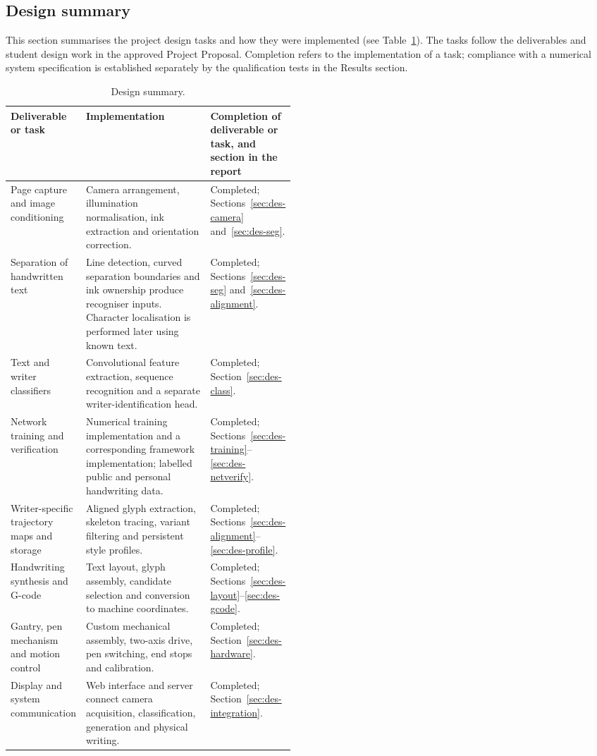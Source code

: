 \subsection{Design summary}
\label{sec:des-summary}
This section summarises the project design tasks and how they were implemented (see Table~\ref{tab:des-summary}). The tasks follow the deliverables and student design work in the approved Project Proposal. Completion refers to the implementation of a task; compliance with a numerical system specification is established separately by the qualification tests in the Results section.

\begin{table}[!htbp]
\centering\small
\begin{tabularx}{\linewidth}{|>{\raggedright\arraybackslash}p{0.24\linewidth}|>{\raggedright\arraybackslash}X|>{\raggedright\arraybackslash}p{0.23\linewidth}|}
\hline
\textbf{Deliverable or task}&\textbf{Implementation}&\textbf{Completion of deliverable or task, and section in the report}\\\hline
Page capture and image conditioning&Camera arrangement, illumination normalisation, ink extraction and orientation correction.&Completed; Sections~\ref{sec:des-camera} and~\ref{sec:des-seg}.\\\hline
Separation of handwritten text&Line detection, curved separation boundaries and ink ownership produce recogniser inputs. Character localisation is performed later using known text.&Completed; Sections~\ref{sec:des-seg} and~\ref{sec:des-alignment}.\\\hline
Text and writer classifiers&Convolutional feature extraction, sequence recognition and a separate writer-identification head.&Completed; Section~\ref{sec:des-class}.\\\hline
Network training and verification&Numerical training implementation and a corresponding framework implementation; labelled public and personal handwriting data.&Completed; Sections~\ref{sec:des-training}--\ref{sec:des-netverify}.\\\hline
Writer-specific trajectory maps and storage&Aligned glyph extraction, skeleton tracing, variant filtering and persistent style profiles.&Completed; Sections~\ref{sec:des-alignment}--\ref{sec:des-profile}.\\\hline
Handwriting synthesis and G-code&Text layout, glyph assembly, candidate selection and conversion to machine coordinates.&Completed; Sections~\ref{sec:des-layout}--\ref{sec:des-gcode}.\\\hline
Gantry, pen mechanism and motion control&Custom mechanical assembly, two-axis drive, pen switching, end stops and calibration.&Completed; Section~\ref{sec:des-hardware}.\\\hline
Display and system communication&Web interface and server connect camera acquisition, classification, generation and physical writing.&Completed; Section~\ref{sec:des-integration}.\\\hline
\end{tabularx}
\caption{Design summary.}
\label{tab:des-summary}
\end{table}

